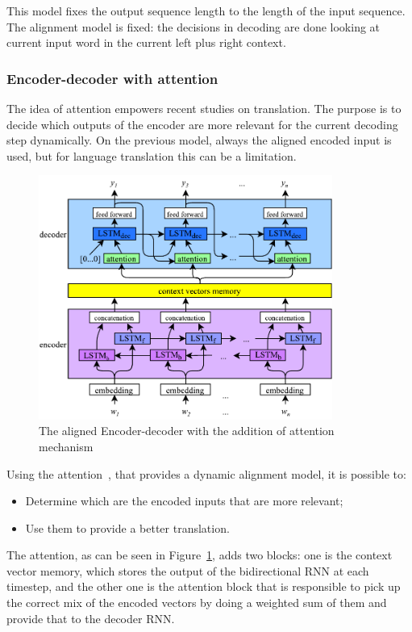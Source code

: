 This model fixes the output sequence length to the length of the input sequence. The alignment model is fixed: the decisions in decoding are done looking at current input word in the current left plus right context.

\subsubsection{Encoder-decoder with attention}
\label{sequenceAttention}

The idea of attention empowers recent studies on translation. The purpose is to decide which outputs of the encoder are more relevant for the current decoding step dynamically. On the previous model, always the aligned encoded input is used, but for language translation this can be a limitation.

\begin{figure}[!htb]
    \centering
    \includegraphics[max width=0.8\linewidth,max height=8cm,keepaspectratio]{figures/encoderDecoderAttention}
    \caption{The aligned Encoder-decoder with the addition of attention mechanism}\label{fig:encoderDecoderAttention}
\end{figure}

Using the attention~\cite{bahdanau2014neural}, that provides a dynamic alignment model, it is possible to:

\begin{itemize}
	\item Determine which are the encoded inputs that are more relevant;
	\item Use them to provide a better translation.
\end{itemize}
The attention, as can be seen in Figure~\ref{fig:encoderDecoderAttention}, adds two blocks: one is the context vector memory, which stores the output of the bidirectional RNN at each timestep, and the other one is the attention block that is responsible to pick up the correct mix of the encoded vectors by doing a weighted sum of them and provide that to the decoder RNN. 

